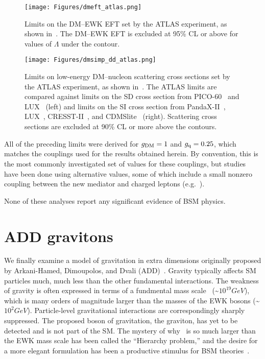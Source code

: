 \begin{figure}[hbtb]
  \begin{center}
    \texttt{[image: Figures/dmeft\_atlas.png]}
    \caption{Limits on the DM--EWK EFT set by the ATLAS experiment, as shown in~\cite{ref:epjc/s10052-017-4965-8}. The DM--EWK EFT is excluded at 95\% CL or above for
    values of $\Lambda$ under the contour.
    }
    \label{fig:dmeft_atlas}
  \end{center}
\end{figure}

\begin{figure}[hbtb]
  \begin{center}
    \texttt{[image: Figures/dmsimp\_dd\_atlas.png]}
    \caption{Limits on low-energy DM--nucleon scattering cross sections set by the ATLAS experiment, as shown in~\cite{ref:epjc/s10052-017-4965-8}. The ATLAS
    limits are compared against limits on the SD cross section from PICO-60~\cite{ref:PICO60-ATLAS} and LUX~\cite{ref:LUX-SD-ATLAS} (left)
    and limits on the SI cross section from PandaX-II~\cite{ref:PANDAX-II-ATLAS}, LUX~\cite{ref:LUX-SI-ATLAS}, CRESST-II~\cite{ref:CRESST-II-ATLAS}, and CDMSlite~\cite{ref:SuperCDMS-ATLAS} (right).
    Scattering cross sections are excluded at 90\% CL or more above the contours.
    }
    \label{fig:dmsimp_dd_atlas}
  \end{center}
\end{figure}

All of the preceding limits were derived for $g_\mathrm{DM} = 1$ and $g_\mathrm{q} = 0.25$, which matches the couplings used for the results obtained herein.
By convention, this is the most commonly investigated set of values for these couplings, but studies have been done using alternative values, some of which
include a small nonzero coupling between the new mediator and charged leptons (e.g.~\cite{ref:epjc/s10052-017-4965-8}).

None of these analyses report any significant evidence of BSM physics.

\section{ADD gravitons} \label{sec:introduction_ADD}
We finally examine a model of gravitation in extra dimensions originally proposed by Arkani-Hamed, Dimoupolos, and Dvali (ADD)~\cite{ref:S0370-2693(98)00466-3}.
Gravity typically affects SM particles much, much less than the other fundamental interactions. The weakness of gravity
is often expressed in terms of a fundmental mass scale \mPl\ (\textasciitilde$10^{19}\unit{GeV}$), which is
many orders of magnitude larger than the masses of the EWK bosons (\textasciitilde$10^{2}\unit{GeV}$). Particle-level gravitational interactions
are correspondingly sharply suppressed. The proposed boson of gravitation, the graviton, has yet to be detected and is not part of the SM.
The mystery of why \mPl\ is so much larger than the EWK mass scale has been called the ``Hierarchy problem,'' and the desire for a
more elegant formulation has been a productive stimulus for BSM theories~\cite{ref:S0370-2693(98)00466-3, ref:0264-9381/32/3/033001}.

